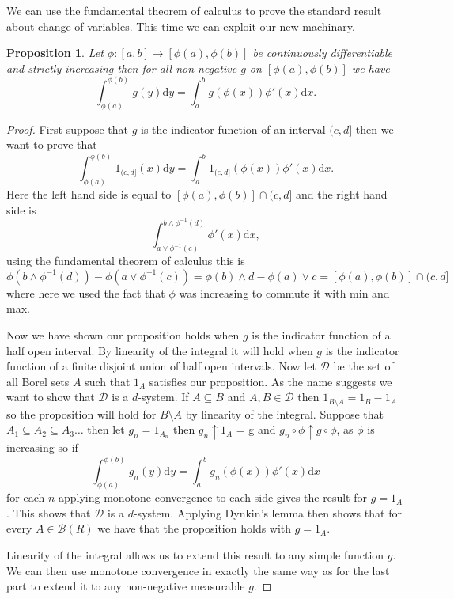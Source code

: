 \documentclass[11pt]{article}
\newtheorem{prp}[thm]{Proposition}
\theoremstyle{definition}
\theoremstyle{remark}
\begin{document}
We can use the fundamental theorem of calculus to prove the standard result about change of variables. This time we can exploit our new machinary. 
\begin{prp}
Let $\phi: [a,b] \rightarrow [\phi(a), \phi(b)]$ be continuously differentiable and strictly increasing then for all non-negative $g$ on $[\phi(a), \phi(b)]$ we have
\[ \int_{\phi(a)}^{\phi(b)}g(y) \mathrm{d}y = \int_a^b g(\phi(x)) \phi'(x) \mathrm{d}x. \]
\end{prp}
\begin{proof}
First suppose that $g$ is the indicator function of an interval $(c,d]$ then we want to prove that
\[ \int_{\phi(a)}^{\phi(b)} 1_{(c,d]}(x) \mathrm{d}y = \int_a^b  1_{(c,d]}(\phi(x)) \phi'(x) \mathrm{d}x.\] Here the left hand side is equal to $[\phi(a), \phi(b)] \cap (c,d]$ and the right hand side is 
\[ \int_{a \vee \phi^{-1}(c)}^{b \wedge \phi^{-1}(d)} \phi'(x) \mathrm{d}x,\] using the fundamental theorem of calculus this is
\[ \phi(b \wedge \phi^{-1}(d)) - \phi(a \vee \phi^{-1}(c)) = \phi(b) \wedge d - \phi(a) \vee c = [\phi(a), \phi(b)] \cap (c,d] \] where here we used the fact that $\phi$ was increasing to commute it with min and max.

Now we have shown our proposition holds when $g$ is the indicator function of a half open interval. By linearity of the integral it will hold when $g$ is the indicator function of a finite disjoint union of half open intervals. Now let $\mathcal{D}$ be the set of all  Borel sets $A$ such that $1_A$ satisfies our proposition. As the name suggests we want to show that $\mathcal{D}$ is a $d$-system. If $A \subseteq B$ and $A, B \in \mathcal{D}$ then $1_{B \setminus A} = 1_B - 1_A$ so the proposition will hold for $B \setminus A$ by linearity of the integral. Suppose that $A_1 \subseteq A_2 \subseteq A_3 \dots$ then let $g_n=1_{A_n}$ then $g_n \uparrow 1_A$ = g and $g_n \circ \phi \uparrow g \circ \phi$, as $\phi$ is increasing so if 
\[ \int_{\phi(a)}^{\phi(b)}g_n(y) \mathrm{d}y = \int_a^b g_n(\phi(x)) \phi'(x) \mathrm{d}x \] for each $n$ applying monotone convergence to each side gives the result for $g = 1_A$. This shows that $\mathcal{D}$ is a $d$-system. Applying Dynkin's lemma then shows that for every $A \in \mathcal{B}(R)$ we have that the proposition holds with $g=1_A$.

Linearity of the integral allows us to extend this result to any simple function $g$. We can then use monotone convergence in exactly the same way as for the last part to extend it to any non-negative measurable $g$.
\end{proof}
\end{document}
